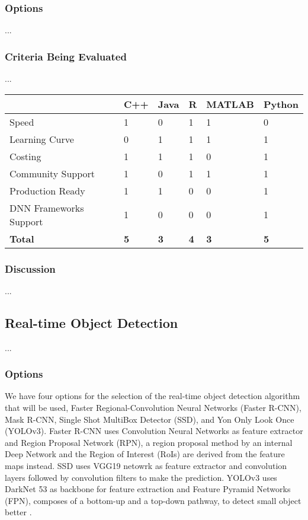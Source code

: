 \subsubsection{Options}
...

\subsubsection{Criteria Being Evaluated}
...

\begin{center}
\begin{tabular}{|l|l|l|l|l|l|}
\hline
           & \textbf{C++} & \textbf{Java} & \textbf{R} & \textbf{MATLAB} & \textbf{Python}\\ \hline
Speed &     1      &      0     &      1     &      1     & 0          \\ \hline
Learning Curve &     0      &     1      &      1     &     1      &    1       \\ \hline
Costing &     1      &     1      &     1      &    0       &       1    \\ \hline
Community Support &      1     &     0      &   1        &      1     &     1      \\ \hline
Production Ready &     1      &     1      &    0       &       0    &      1     \\ \hline
DNN Frameworks Support &     1      &      0     &     0      &        0   &   1        \\ \hline
\textbf{Total} &      \textbf{5}     &   \textbf{3}        &      \textbf{4}     &     \textbf{3}      &    \textbf{5}       \\ \hline
\end{tabular}
\end{center}

\subsubsection{Discussion}
...

\subsection{Real-time Object Detection}
...
\subsubsection{Options}
We have four options for the selection of the real-time object detection algorithm that will be used, Faster Regional-Convolution Neural Networks (Faster R-CNN)\cite{fasterrcnn}, Mask R-CNN\cite{maskrcnn}, Single Shot MultiBox Detector (SSD)\cite{SSD}, and Yon Only Look Once (YOLOv3)\cite{YOLOv3}. Faster R-CNN uses Convolution Neural Networks as feature extractor and Region Proposal Network (RPN), a region proposal method by an internal Deep Network and the Region of Interest (RoIs) are derived from the feature maps instead. SSD uses VGG19 netowrk as feature extractor and convolution layers followed by convolution filters to make the prediction. YOLOv3 uses DarkNet 53 as backbone for feature extraction and Feature Pyramid Networks (FPN), composes of a bottom-up and a top-down pathway, to detect small object better \cite{pda3}.

